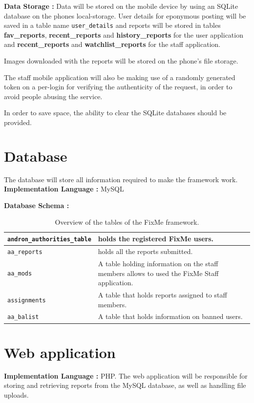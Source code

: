 \documentclass[12pt]{ecsproject}     %
\begin{document}
\textbf{Data Storage : } Data will be stored on the mobile device by using an SQLite database on the phones local-storage. User details for eponymous posting will be saved in a table name \texttt{user\_details} and reports will be stored in tables \textbf{fav\_reports}, \textbf{recent\_reports} and  \textbf{history\_reports} for the user application and \textbf{recent\_reports} and \textbf{watchlist\_reports} for the staff application.

Images downloaded with the reports will be stored on the phone's file storage.

The staff mobile application will also be making use of a randomly generated token on a per-login for verifying the authenticity of the request, in order to avoid people abusing the service.

In order to save space, the ability to clear the SQLite databases should be provided.

\section{Database}
The database will store all information required to make the framework work.
\textbf{Implementation Language : } MySQL

\textbf{Database Schema : }

\begin{table}[ht]
\begin{tabular}[ht]{p{5cm} | p{8cm} }
\texttt{andron\_authorities\_table} & holds the registered FixMe users. \\ 
\hline
\texttt{aa\_reports} & holds all the reports submitted.\\
\hline
\texttt{aa\_mods} & A table holding information on the staff members allows to used the FixMe Staff application. \\
\hline
\texttt{assignments} &  A table that holds reports assigned to staff members. \\
\hline
\texttt{aa\_balist} & A table that holds information on banned users. \\
\end{tabular}
\caption{Overview of the tables of the FixMe framework.}
\end{table}

\section{Web application}
\textbf{Implementation Language : } PHP.
The web application will be responsible for storing and retrieving reports from the MySQL database, as well as handling file uploads.
\end{document}
